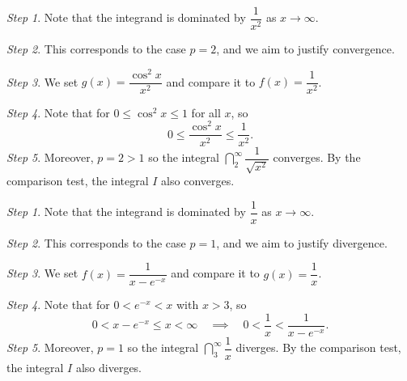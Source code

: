 \begin{ex}[Apply the comparison test to $I = \dint_2^\infty \dfrac{\cos^2 x}{x^2}\dd x$] 

    \textit{Step 1}. Note that the integrand is dominated by $\dfrac{1}{x^2}$ as $x \to \infty$. 
    
    \textit{Step 2}. This corresponds to the case $ p = 2 $, and we aim to justify convergence.
    
    \textit{Step 3}. We set $g(x) = \dfrac{\cos^2 x}{x^2}$ and compare it to $f(x) = \dfrac{1}{x^2}$.

    \textit{Step 4}. Note that for $0 \leq \cos^2 x \leq 1$ for all $x$, so 
    \[0 \leq \dfrac{\cos^2 x}{x^2} \leq \dfrac{1}{x^2}.\]
    \textit{Step 5}. Moreover, $p = 2 > 1$ so the integral $\dint_2^\infty \dfrac{1}{\sqrt{x^2}}$ converges. By the comparison test, the integral $I$ also converges. 
\end{ex}


\begin{ex}[Apply the comparison test to $I = \dint_3^\infty \dfrac{1}{x - e^{-x}}\dd x$]
    
    \textit{Step 1}. Note that the integrand is dominated by $\dfrac{1}{x}$ as $x \to \infty$. 
    
    \textit{Step 2}. This corresponds to the case $ p = 1 $, and we aim to justify divergence.
    
    \textit{Step 3}. We set $f(x) = \dfrac{1}{x - e^{-x}}$ and compare it to $g(x) = \dfrac{1}{x}$.

    \textit{Step 4}. Note that for $0 < e^{-x} < x$ with $x>3$, so 
    \[0 < x- e^{-x} \leq x < \infty \quad \implies \quad 0 < \dfrac{1}{x} < \dfrac{1}{x - e^{-x}}.\]
    \textit{Step 5}. Moreover, $p = 1$ so the integral $\dint_3^\infty \dfrac{1}{x}$ diverges. By the comparison test, the integral $I$ also diverges. 
\end{ex}